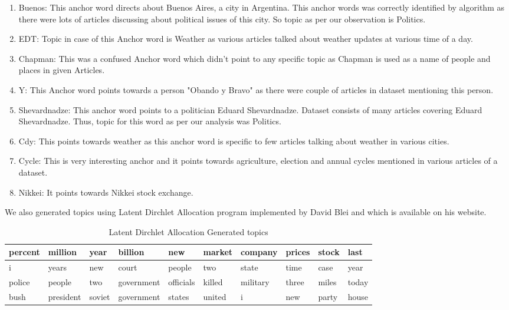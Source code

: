 \documentclass[a4paper,11pt]{article}
\begin{document}
\begin{enumerate}
\item Buenos: This anchor word directs about Buenos Aires, a city in Argentina. This anchor words was correctly identified by algorithm as there were lots of articles discussing about political issues of this city. So topic as per our observation is Politics. 

\item EDT: Topic in case of this Anchor word is Weather as various articles talked about weather updates at various time of a day. 

\item Chapman: This was a confused Anchor word which didn't point to any specific topic as Chapman is used as a name of people and places in given Articles. 

\item Y: This Anchor word points towards a person "Obando y Bravo" as there were couple of articles in dataset mentioning this person. 

\item Shevardnadze: This anchor word points to a politician Eduard Shevardnadze. Dataset consists of many articles covering Eduard Shevardnadze. Thus, topic for this word as per our analysis was Politics. 

\item Cdy: This points towards weather as this anchor word is specific to few articles talking about weather in various cities. 

\item Cycle: This is very interesting anchor and it points towards agriculture, election and annual cycles mentioned in various articles of a dataset. 

\item Nikkei: It points towards Nikkei stock exchange. 

\end{enumerate}


We also generated topics using Latent Dirchlet Allocation program implemented by David Blei and which is available on his website.  \\


\begin{table}[h]
    \begin{tabular}{|l|l|l|l|l|l|l|l|l|l|}
    \hline
    percent & million   & year   & billion    & new       & market & company  & prices & stock & last  \\ \hline
    i       & years     & new    & court      & people    & two    & state    & time   & case  & year  \\ \hline
    police  & people    & two    & government & officials & killed & military & three  & miles & today \\ \hline
    bush    & president & soviet & government & states    & united & i        & new    & party & house \\ \hline
    \end{tabular}
    \caption {Latent Dirchlet Allocation Generated topics}
\end{table}
\end{document}
